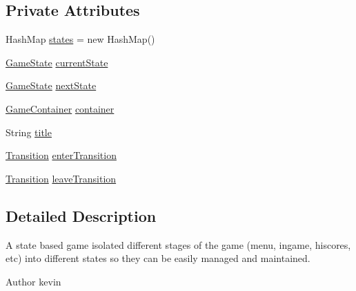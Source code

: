\subsection*{Private Attributes}
\begin{DoxyCompactItemize}
\item 
Hash\+Map \mbox{\hyperlink{classorg_1_1newdawn_1_1slick_1_1state_1_1_state_based_game_afcb267d4d03f668717d13a91e839272c}{states}} = new Hash\+Map()
\item 
\mbox{\hyperlink{interfaceorg_1_1newdawn_1_1slick_1_1state_1_1_game_state}{Game\+State}} \mbox{\hyperlink{classorg_1_1newdawn_1_1slick_1_1state_1_1_state_based_game_a6a45e68094bb9b7ec30b8a8b7d415766}{current\+State}}
\item 
\mbox{\hyperlink{interfaceorg_1_1newdawn_1_1slick_1_1state_1_1_game_state}{Game\+State}} \mbox{\hyperlink{classorg_1_1newdawn_1_1slick_1_1state_1_1_state_based_game_a906a42ee0655627f02af989e6490d848}{next\+State}}
\item 
\mbox{\hyperlink{classorg_1_1newdawn_1_1slick_1_1_game_container}{Game\+Container}} \mbox{\hyperlink{classorg_1_1newdawn_1_1slick_1_1state_1_1_state_based_game_a538846600436175cbed48450adfdd025}{container}}
\item 
String \mbox{\hyperlink{classorg_1_1newdawn_1_1slick_1_1state_1_1_state_based_game_ad5ae50bad0540ad69248f69f663aef33}{title}}
\item 
\mbox{\hyperlink{interfaceorg_1_1newdawn_1_1slick_1_1state_1_1transition_1_1_transition}{Transition}} \mbox{\hyperlink{classorg_1_1newdawn_1_1slick_1_1state_1_1_state_based_game_a85aa7a1bf06d60e2143e5ba002d9088a}{enter\+Transition}}
\item 
\mbox{\hyperlink{interfaceorg_1_1newdawn_1_1slick_1_1state_1_1transition_1_1_transition}{Transition}} \mbox{\hyperlink{classorg_1_1newdawn_1_1slick_1_1state_1_1_state_based_game_aa946e59415cf0a3ebbe6d4595c9bc0f1}{leave\+Transition}}
\end{DoxyCompactItemize}


\subsection{Detailed Description}
A state based game isolated different stages of the game (menu, ingame, hiscores, etc) into different states so they can be easily managed and maintained.

\begin{DoxyAuthor}{Author}
kevin 
\end{DoxyAuthor}


